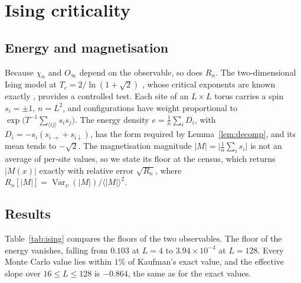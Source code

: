 \documentclass[ba]{imsart}
\theoremstyle{plain}
\theoremstyle{definition}
\newcommand{\Var}{\operatorname{Var}}
\begin{document}
\section{Ising criticality}\label{sec:ising}

\subsection{Energy and magnetisation}

Because $\chi_n$ and $O_\infty$ depend on the observable, so does $R_n$. The two-dimensional Ising model at $T_c=2/\ln(1+\sqrt2)$ \citep{Onsager1944}, whose critical exponents are known exactly \citep{Baxter1982,Yang1952}, provides a controlled test. Each site of an $L\times L$ torus carries a spin $s_i=\pm1$, $n=L^2$, and configurations have weight proportional to $\exp\bigl(T^{-1}\sum_{\langle ij\rangle}s_is_j\bigr)$. The energy density $e=\frac1n\sum_iD_i$, with $D_i=-s_i(s_{i\to}+s_{i\downarrow})$, has the form required by Lemma~\ref{lem:decomp}, and its mean tends to $-\sqrt2$. The magnetisation magnitude $|M|=\bigl|\frac1n\sum_is_i\bigr|$ is not an average of per-site values, so we state its floor at the census, which returns $|M(x)|$ exactly with relative error $\sqrt{R_n}$, where $R_n[|M|]=\Var_\nu(|M|)/\langle|M|\rangle^2$.

\subsection{Results}

Table~\ref{tab:ising} compares the floors of the two observables. The floor of the energy vanishes, falling from $0.103$ at $L=4$ to $3.94\times10^{-4}$ at $L=128$. Every Monte Carlo value lies within $1\%$ of Kaufman's exact value, and the effective slope over $16\le L\le128$ is $-0.864$, the same as for the exact values.
\end{document}
